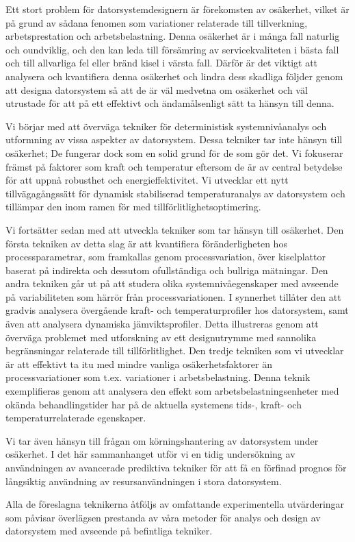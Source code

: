 Ett stort problem för datorsystemdesignern är förekomsten av osäkerhet, vilket
är på grund av sådana fenomen som variationer relaterade till tillverkning,
arbetsprestation och arbetsbelastning. Denna osäkerhet är i många fall naturlig
och oundviklig, och den kan leda till försämring av servicekvaliteten i bästa
fall och till allvarliga fel eller bränd kisel i värsta fall. Därför är det
viktigt att analysera och kvantifiera denna osäkerhet och lindra dess skadliga
följder genom att designa datorsystem så att de är väl medvetna om osäkerhet och
väl utrustade för att på ett effektivt och ändamålsenligt sätt ta hänsyn till
denna.

Vi börjar med att överväga tekniker för deterministisk systemnivåanalys och
utformning av vissa aspekter av datorsystem. Dessa tekniker tar inte hänsyn till
osäkerhet; De fungerar dock som en solid grund för de som gör det. Vi fokuserar
främst på faktorer som kraft och temperatur eftersom de är av central betydelse
för att uppnå robusthet och energieffektivitet. Vi utvecklar ett nytt
tillvägagångssätt för dynamisk stabiliserad temperaturanalys av datorsystem och
tillämpar den inom ramen för med tillförlitlighetsoptimering.

Vi fortsätter sedan med att utveckla tekniker som tar hänsyn till osäkerhet. Den
första tekniken av detta slag är att kvantifiera föränderligheten hos
processparametrar, som framkallas genom processvariation, över kiselplattor
baserat på indirekta och dessutom ofullständiga och bullriga mätningar. Den
andra tekniken går ut på att studera olika systemnivåegenskaper med avseende på
variabiliteten som härrör från processvariationen. I synnerhet tillåter den att
gradvis analysera övergående kraft- och temperaturprofiler hos datorsystem, samt
även att analysera dynamiska jämviktsprofiler. Detta illustreras genom att
överväga problemet med utforskning av ett designutrymme med sannolika
begränsningar relaterade till tillförlitlighet. Den tredje tekniken som vi
utvecklar är att effektivt ta itu med mindre vanliga osäkerhetsfaktorer än
processvariationer som t.ex. variationer i arbetsbelastning. Denna teknik
exemplifieras genom att analysera den effekt som arbetsbelastningsenheter med
okända behandlingstider har på de aktuella systemens tids-, kraft- och
temperaturrelaterade egenskaper.

Vi tar även hänsyn till frågan om körningshantering av datorsystem under
osäkerhet. I det här sammanhanget utför vi en tidig undersökning av användningen
av avancerade prediktiva tekniker för att få en förfinad prognos för långsiktig
användning av resursanvändningen i stora datorsystem.

Alla de föreslagna teknikerna åtföljs av omfattande experimentella utvärderingar
som påvisar överlägsen prestanda av våra metoder för analys och design av
datorsystem med avseende på befintliga tekniker.

